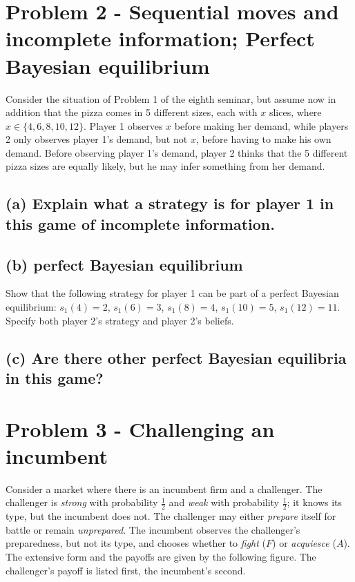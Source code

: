 \documentclass{article}
\begin{document}
\section{Problem 2 - Sequential moves and incomplete information; Perfect
Bayesian equilibrium}

Consider the situation of Problem 1 of the eighth seminar, but assume now in addition that the pizza comes in 5
different sizes, each with $x$ slices, where $x \in \{4, 6, 8, 10, 12\}$. Player 1 observes $x$
before making her demand, while players 2 only observes player 1's demand, but not $x$, before
having to make his own demand. Before observing player 1's demand, player 2 thinks that the 5
different pizza sizes are equally likely, but he may infer something from her demand.
%

%
\subsection{(a) Explain what a strategy is for player 1 in this game of incomplete information.} 
%
\subsection{(b) perfect Bayesian
equilibrium} Show that the following strategy for player 1 can be part of a perfect Bayesian
equilibrium: $s_1(4) = 2$, $s_1(6) = 3$, $s_1(8) = 4$, $s_1(10) = 5$, $s_1(12) = 11$. Specify
both player 2's strategy and player 2's beliefs. 
%
\subsection{(c) Are there other perfect Bayesian equilibria in this game?} %


\bigskip

\section{Problem 3 - Challenging an incumbent}

Consider a market where there is an incumbent firm and a challenger. The challenger is
\textit{strong} with probability $\tfrac12$ and \textit{weak} with probability $\tfrac12$; it knows its type, but the incumbent
does not. The challenger may either \textit{prepare} itself for battle or remain \textit{unprepared}. The
incumbent observes the challenger's preparedness, but not its type, and chooses whether to
\textit{fight} ($F$) or \textit{acquiesce} ($A$). The extensive form and the payoffs are given by the following
figure. The challenger's payoff is listed first, the incumbent's second.
\end{document}
